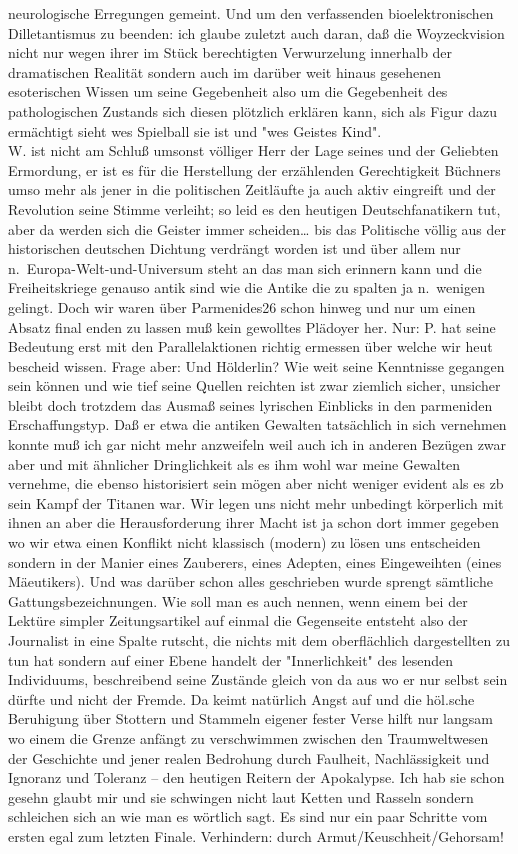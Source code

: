 \documentclass[
]{article}
\begin{document}
neurologische Erregungen gemeint. Und um den verfassenden
bioelektronischen Dilletantismus zu beenden: ich glaube zuletzt auch
daran, daß die Woyzeckvision nicht nur wegen ihrer im Stück berechtigten
Verwurzelung innerhalb der dramatischen Realität sondern auch im darüber
weit hinaus gesehenen esoterischen Wissen um seine Gegebenheit also um
die Gegebenheit des pathologischen Zustands sich diesen plötzlich
erklären kann, sich als Figur dazu ermächtigt sieht wes Spielball sie
ist und "wes Geistes Kind".\\
W. ist nicht am Schluß umsonst völliger Herr der Lage seines und der
Geliebten Ermordung, er ist es für die Herstellung der erzählenden
Gerechtigkeit Büchners umso mehr als jener in die politischen Zeitläufte
ja auch aktiv eingreift und der Revolution seine Stimme verleiht; so
leid es den heutigen Deutschfanatikern tut, aber da werden sich die
Geister immer scheiden\ldots{} bis das Politische völlig aus der
historischen deutschen Dichtung verdrängt worden ist und über allem nur
n.~Europa-Welt-und-Universum steht an das man sich erinnern kann und die
Freiheitskriege genauso antik sind wie die Antike die zu spalten ja
n.~wenigen gelingt. Doch wir waren über Parmenides26 schon hinweg und
nur um einen Absatz final enden zu lassen muß kein gewolltes Plädoyer
her. Nur: P. hat seine Bedeutung erst mit den Parallelaktionen richtig
ermessen über welche wir heut bescheid wissen. Frage aber: Und
Hölderlin? Wie weit seine Kenntnisse gegangen sein können und wie tief
seine Quellen reichten ist zwar ziemlich sicher, unsicher bleibt doch
trotzdem das Ausmaß seines lyrischen Einblicks in den parmeniden
Erschaffungstyp. Daß er etwa die antiken Gewalten tatsächlich in sich
vernehmen konnte muß ich gar nicht mehr anzweifeln weil auch ich in
anderen Bezügen zwar aber und mit ähnlicher Dringlichkeit als es ihm
wohl war meine Gewalten vernehme, die ebenso historisiert sein mögen
aber nicht weniger evident als es zb sein Kampf der Titanen war. Wir
legen uns nicht mehr unbedingt körperlich mit ihnen an aber die
Herausforderung ihrer Macht ist ja schon dort immer gegeben wo wir etwa
einen Konflikt nicht klassisch (modern) zu lösen uns entscheiden sondern
in der Manier eines Zauberers, eines Adepten, eines Eingeweihten (eines
Mäeutikers). Und was darüber schon alles geschrieben wurde sprengt
sämtliche Gattungsbezeichnungen. Wie soll man es auch nennen, wenn einem
bei der Lektüre simpler Zeitungsartikel auf einmal die Gegenseite
entsteht also der Journalist in eine Spalte rutscht, die nichts mit dem
oberflächlich dargestellten zu tun hat sondern auf einer Ebene handelt
der "Innerlichkeit" des lesenden Individuums, beschreibend seine
Zustände gleich von da aus wo er nur selbst sein dürfte und nicht der
Fremde. Da keimt natürlich Angst auf und die höl.sche Beruhigung über
Stottern und Stammeln eigener fester Verse hilft nur langsam wo einem
die Grenze anfängt zu verschwimmen zwischen den Traumweltwesen der
Geschichte und jener realen Bedrohung durch Faulheit, Nachlässigkeit und
Ignoranz und Toleranz -- den heutigen Reitern der Apokalypse. Ich hab
sie schon gesehn glaubt mir und sie schwingen nicht laut Ketten und
Rasseln sondern schleichen sich an wie man es wörtlich sagt. Es sind nur
ein paar Schritte vom ersten egal zum letzten Finale. Verhindern: durch
Armut/Keuschheit/Gehorsam!
\end{document}
